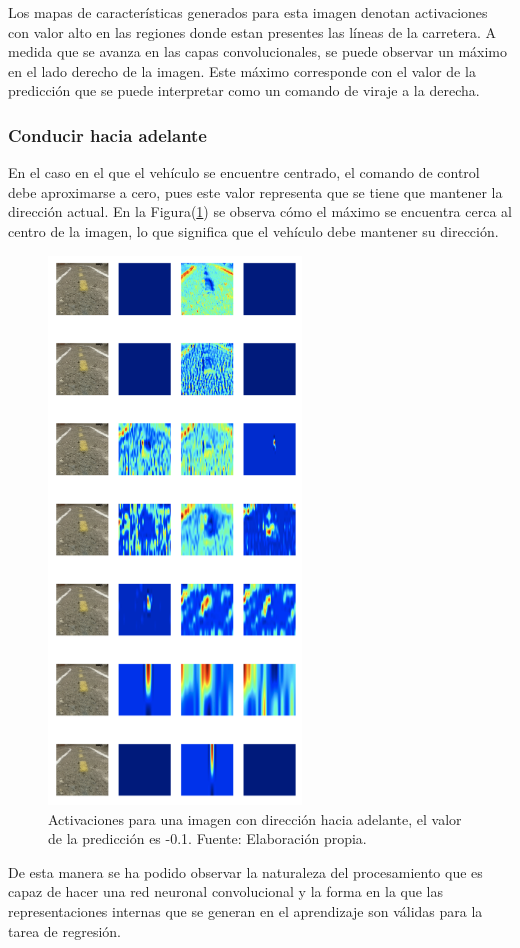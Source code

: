        Los mapas de características generados para esta imagen denotan activaciones con valor alto en las regiones donde estan 
        presentes las líneas de la carretera. A medida que se avanza en las capas convolucionales, se puede observar un máximo 
        en el lado derecho de la imagen. Este máximo corresponde con el valor de la predicción que se puede interpretar como un comando 
        de viraje a la derecha.


        \subsubsection{Conducir hacia adelante}
        En el caso en el que el vehículo se encuentre centrado, el comando de control debe aproximarse a cero, pues este 
        valor representa que se tiene que mantener la dirección actual. En la Figura(\ref{fig:predade}) se observa cómo el máximo se encuentra 
        cerca al centro de la imagen, lo que significa que el vehículo debe mantener su dirección. 


        \begin{figure}[!h] 
            \centering
            \includegraphics[width=0.60\textwidth]{img/predade}
            \caption[Activaciones para una imagen con dirección hacia adelante]{Activaciones para una imagen con dirección hacia adelante, el valor de 
            la predicción es -0.1. Fuente: Elaboración propia. }
            \label{fig:predade}
        \end{figure}

        De esta manera se ha podido observar la naturaleza del procesamiento que es capaz de hacer una red neuronal convolucional 
        y la forma en la que las representaciones internas que se generan en el aprendizaje son válidas para la 
        tarea de regresión.

